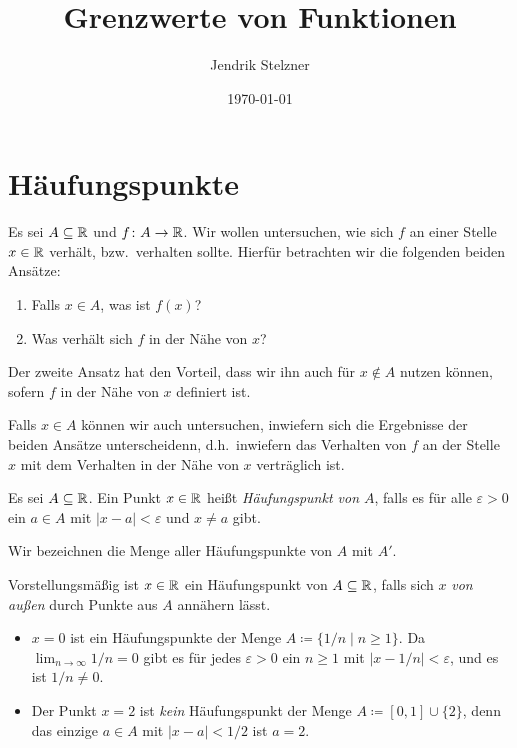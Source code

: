 \documentclass[a4paper,10pt]{article}
\title{Grenzwerte von Funktionen}
\author{Jendrik Stelzner}
\date{\today}
\begin{document}
\maketitle

\tableofcontents





\section{Häufungspunkte}


Es sei $A \subseteq \mathbb{R}$ und $f \colon A \to \mathbb{R}$. Wir wollen untersuchen, wie sich $f$ an einer Stelle $x \in \mathbb{R}$ verhält, bzw.\ verhalten sollte. Hierfür betrachten wir die folgenden beiden Ansätze:


\begin{enumerate}
 \item
  Falls $x \in A$, was ist $f(x)$?
 \item
  Was verhält sich $f$ in der Nähe von $x$?
\end{enumerate}


Der zweite Ansatz hat den Vorteil, dass wir ihn auch für $x \notin A$ nutzen können, sofern $f$ in der Nähe von $x$ definiert ist.

Falls $x \in A$ können wir auch untersuchen, inwiefern sich die Ergebnisse der beiden Ansätze unterscheidenn, d.h.\ inwiefern das Verhalten von $f$ an der Stelle $x$ mit dem Verhalten in der Nähe von $x$ verträglich ist.


\begin{defi}
 Es sei $A \subseteq \mathbb{R}$. Ein Punkt $x \in \mathbb{R}$ heißt \emph{Häufungspunkt von $A$}, falls es für alle $\varepsilon > 0$ ein $a \in A$ mit $|x-a| < \varepsilon$ und $x \neq a$ gibt.
 
 Wir bezeichnen die Menge aller Häufungspunkte von $A$ mit $A'$.
\end{defi}


Vorstellungsmäßig ist $x \in \mathbb{R}$ ein Häufungspunkt von $A \subseteq \mathbb{R}$, falls sich $x$ \emph{von außen} durch Punkte aus $A$ annähern lässt.


\begin{bsp}
 \begin{itemize}
  \item
   $x = 0$ ist ein Häufungspunkte der Menge $A \coloneqq \{1/n \mid n \geq 1\}$. Da $\lim_{n \to \infty} 1/n = 0$ gibt es für jedes $\varepsilon > 0$  ein $n \geq 1$ mit $|x-1/n| < \varepsilon$, und es ist $1/n \neq 0$.
  \item
   Der Punkt $x = 2$ ist \emph{kein} Häufungspunkt der Menge $A \coloneqq [0,1] \cup \{2\}$, denn das einzige $a \in A$ mit $|x-a| < 1/2$ ist $a = 2$.
 \end{itemize}
\end{bsp}
\end{document}
